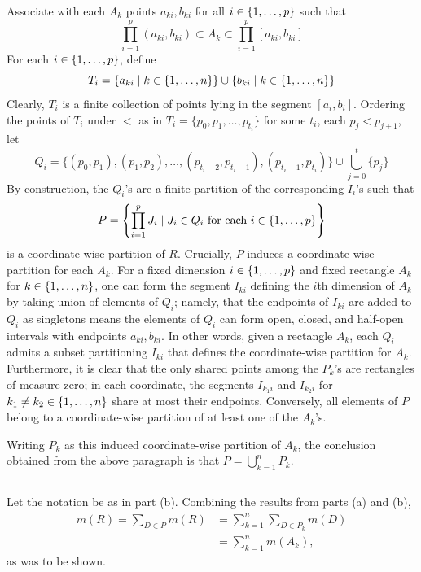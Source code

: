 \documentclass[12pt]{article}
\begin{document}
Associate with each $A_k$ points $a_{ki}, b_{ki}$ for all $i \in \{1, \ldots, p\}$ such that 
$$\prod_{i = 1}^{p}(a_{ki}, b_{ki}) \subset A_k \subset \prod_{i = 1}^{p} [a_{ki}, b_{ki}]$$
For each $i \in \{1, \ldots, p\}$, define 
$$T_i = \{a_{ki} \mid k \in \{1, \ldots, n\}\} \cup \{b_{ki} \mid k \in \{1, \ldots, n\}\}$$ 
Clearly, $T_i$ is a finite collection of points lying in the segment $[a_i, b_i]$. 
Ordering the points of $T_i$ under $<$ as in $T_i = \{p_0, p_1, \ldots, p_{t_i}\}$ for some $t_i$, each $p_{j} < p_{j + 1}$, let 
$$Q_i = \{(p_0, p_1), (p_1, p_2), \ldots, (p_{t_i - 2}, p_{t_i - 1}), (p_{t_i - 1}, p_{t_i})\} \cup \bigcup_{j = 0}^{t} \{p_{j}\}$$
By construction, the $Q_i$'s are a finite partition of the corresponding $I_i$'s such that 
$$P = \left\{\prod_{i = 1}^{p} J_i \mid J_i \in Q_i \text{ for each } i \in \{1, \ldots, p\}\right\}$$
is a coordinate-wise partition of $R$. 
Crucially, $P$ induces a coordinate-wise partition for each $A_k$.
For a fixed dimension $i \in \{1, \ldots, p\}$ and fixed rectangle $A_k$ for $k \in \{1, \ldots, n\}$, one can form the segment $I_{ki}$ defining the $i$th dimension of $A_k$ by taking union of elements of $Q_i$; 
namely, that the endpoints of $I_{ki}$ are added to $Q_i$ as singletons means the elements of $Q_i$ can form open, closed, and half-open intervals with endpoints $a_{ki}, b_{ki}$. 
In other words, given a rectangle $A_k$, each $Q_i$ admits a subset partitioning $I_{ki}$ that defines the coordinate-wise partition for $A_k$. 
Furthermore, it is clear that the only shared points among the $P_k$'s are rectangles of measure zero; 
in each coordinate, the segments $I_{k_1 i}$ and $I_{k_2 i}$ for $k_1 \neq k_2 \in \{1, \ldots, n\}$ share at most their endpoints.
Conversely, all elements of $P$ belong to a coordinate-wise partition of at least one of the $A_k$'s. 

Writing $P_k$ as this induced coordinate-wise partition of $A_k$, the conclusion obtained from the above paragraph is that $P = \bigcup_{k = 1}^{n} P_k$. 

\subsection{}
Let the notation be as in part (b). 
Combining the results from parts (a) and (b), 
\begin{align*}
  m(R) = \sum_{D \in P} m(R) 
  & = \sum_{k = 1}^{n} \sum_{D \in P_k} m(D) \\ 
  & = \sum_{k = 1}^{n} m(A_k),
\end{align*}
as was to be shown.
\end{document}
